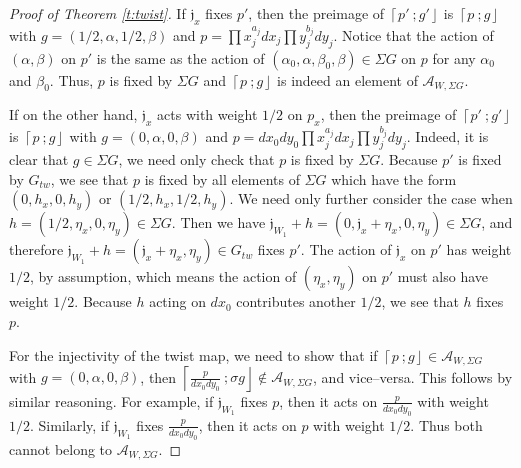 \documentclass[10pt, letterpaper]{amsart}
\theoremstyle{remark}
\newcommand{\sA}{\mathscr{A}}
\newcommand{\fjrw}[2]{ \left\lceil #1 \:; #2 \right\rfloor }
\newcommand{\jw}{\mathfrak{j}}
\newcommand{\tw}[1]{{#1}_{tw}}
\newcommand{\s}[1]{\Sigma #1}
\begin{document}
\begin{proof}[Proof of Theorem \ref{t:twist}]
If $\jw_x$ fixes $p'$, then the preimage of $\fjrw{p'}{g'}$ is $\fjrw{p}{g}$ with $g=(1/2,\alpha,1/2,\beta)$ and $p=\prod x_j^{a_j}dx_j \prod y_j^{b_j}dy_j$. Notice that the action of $(\alpha, \beta)$ on $p'$ is the same as the action of $(\alpha_0, \alpha, \beta_0, \beta)\in \s{G}$ on $p$ for any $\alpha_0$ and $\beta_0$.  Thus, $p$ is fixed by $\s{G}$ and $\fjrw{p}{g}$  is indeed an element of $\sA_{W,\s{G}}$.

If on the other hand, $\jw_x$ acts with weight $1/2$ on $p_x$, then the preimage of $\fjrw{p'}{g'}$ is $\fjrw{p}{g}$ with $g=(0,\alpha,0,\beta)$ and $p=dx_0 dy_0\prod x_j^{a_j}dx_j \prod y_j^{b_j}dy_j$. Indeed, it is clear that $g\in \s{G}$, we need only check that $p$ is fixed by $\s{G}$. Because $p'$ is fixed by $\tw{G}$, we see that $p$ is fixed by all elements of $\s{G}$ which have the form $(0,h_x,0,h_y)$ or $(1/2,h_x,1/2,h_y)$. We need only further consider the case when $h=(1/2,\eta_x,0,\eta_y)\in \s{G}$. Then we have $\jw_{W_1}+h=(0,\jw_x+\eta_x,0,\eta_y)\in \s{G}$, and therefore $\jw_{W_1}+h=(\jw_x+\eta_x,\eta_y)\in \tw{G}$ fixes $p'$. The action of $\jw_x$ on $p'$ has weight $1/2$, by assumption, which means the action of $(\eta_x, \eta_y)$ on $p'$ must also have weight $1/2$. Because $h$ acting on $dx_0$ contributes another $1/2$, we see that $h$ fixes $p$. 

For the injectivity of the twist map, we need to show that if $\fjrw{p}{g}\in \sA_{W,\s{G}}$ with $g=(0, \alpha, 0, \beta)$, then $\fjrw{\tfrac{p}{dx_0 dy_0}}{\sigma g}\notin \sA_{W,\s{G}}$, and vice--versa. This follows by similar reasoning. For example, if $\jw_{W_1}$ fixes $p$, then it acts on $\tfrac{p}{dx_0 dy_0}$ with weight $1/2$. Similarly, if  $\jw_{W_1}$ fixes $\tfrac{p}{dx_0 dy_0}$, then it acts on $p$ with weight $1/2$. Thus both cannot belong to $\sA_{W,\s{G}}$. 


\end{proof}
\end{document}
